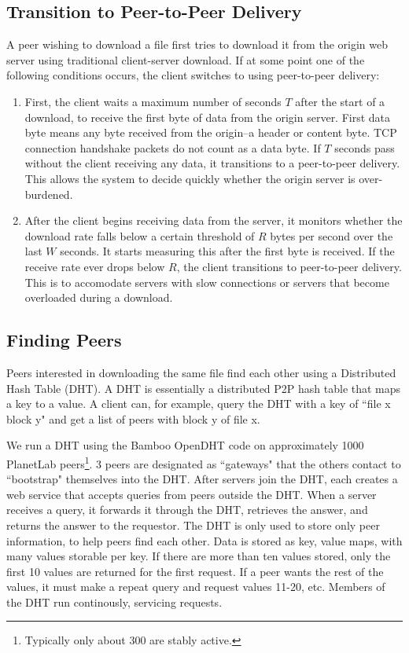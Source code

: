 \subsection{Transition to Peer-to-Peer Delivery}

A peer wishing to download a file first tries to download it from the origin web server using traditional client-server download.  
If at some point one of the following conditions occurs, the client switches to using 
peer-to-peer delivery:
\begin{enumerate}
\item First, the client waits a maximum number of seconds $T$ after the start of a download, to receive the first byte of data from the origin server.  
First data byte means any byte received from the origin--a header or content byte.  TCP connection handshake packets do not count as a data byte.
If $T$ seconds pass without the client receiving any data, it transitions to a peer-to-peer delivery.  This allows the system to decide quickly whether the origin server is over-burdened.   
\item After the client begins receiving data from the server, it monitors whether the download rate falls below a certain 
threshold of $R$ bytes per second over the last $W$ seconds.  It starts measuring this after the first byte is received.  
If the receive rate ever drops below $R$, the client transitions to peer-to-peer delivery.  
This is to accomodate servers with slow connections or servers that become overloaded during a download.
\end{enumerate}

\subsection{Finding Peers}


Peers interested in downloading the same file find each other using a Distributed Hash Table (DHT).
A DHT is essentially a distributed P2P hash table that maps a key to a value.  A client can,
for example, query the DHT with a key of ``file x block y" and get a list of peers with block y
of file x.

We run a DHT using the Bamboo OpenDHT code on approximately 1000 PlanetLab peers\footnote{Typically only about 300 are stably active.}.  
3 peers are designated as ``gateways" that the others contact to ``bootstrap" themselves into the DHT.  After servers join the DHT, each 
creates a web service that accepts queries from peers outside the DHT.  When a server receives a
query, it forwards it through the DHT, retrieves the answer, and returns the answer to the requestor. The DHT is only used to store only peer information, 
to help peers find each other.
Data is stored as key, value maps, with many values storable per key.  If there are more than ten values stored, only the first 10 values are returned for the first request. 
If a peer wants the rest of the values, it must make a repeat query and request values 11-20, etc.  Members of the DHT run continously, servicing requests.

